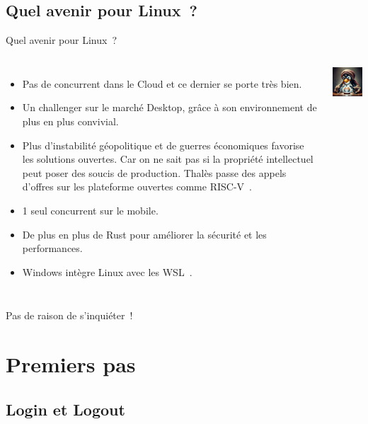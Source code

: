 \documentclass{beamer}
\begin{document}
    \subsection{Quel avenir pour Linux~?}\label{subsec:future-of-linux}

    \begin{frame}{Quel avenir pour Linux~?}
        \begin{columns}
            \begin{itemize}
                \item Pas de concurrent dans le Cloud et ce dernier se porte très bien.
                \item Un challenger sur le marché Desktop, grâce à son environnement de plus en plus convivial.
                \item Plus d'instabilité géopolitique et de guerres économiques favorise les solutions ouvertes.
                Car on ne sait pas si la propriété intellectuel peut poser des soucis de production.
                Thalès passe des appels d'offres sur les plateforme ouvertes comme RISC-V~.
                \item 1 seul concurrent sur le mobile.
                \item De plus en plus de Rust pour améliorer la sécurité et les performances.
                \item Windows intègre Linux avec les WSL~.
            \end{itemize}
            \centering
            \includegraphics[width=4cm]{image/pinguin-fortune-teller}
        \end{columns}
        \bigbreak
        Pas de raison de s'inquiéter~!
    \end{frame}


    \section{Premiers pas}\label{sec:first-step}

    \subsection{Login et Logout}\label{subsec:login-logout}
\end{document}
